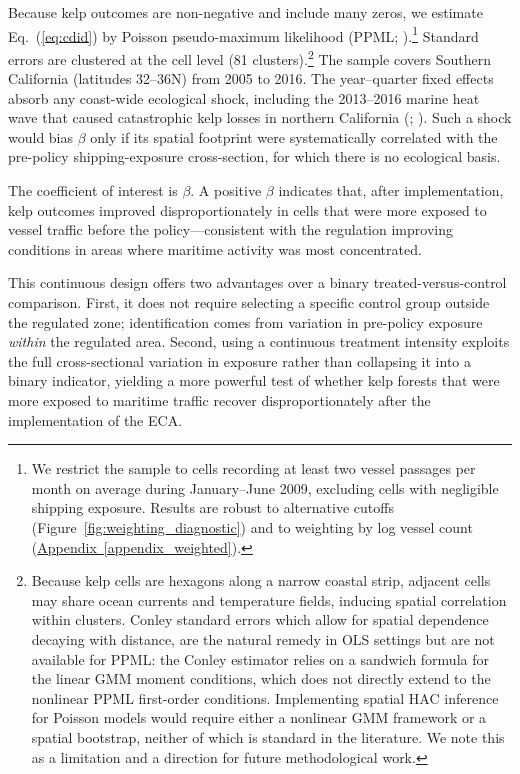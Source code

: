 \documentclass[12pt]{article}
\begin{document}
Because kelp outcomes are non-negative and include many zeros, we estimate Eq.~(\ref{eq:cdid}) by Poisson pseudo-maximum likelihood (PPML; \citealp{SantosSilva2006}).\footnote{We restrict the sample to cells recording at least two vessel passages per month on average during January--June 2009, excluding cells with negligible shipping exposure. Results are robust to alternative cutoffs (Figure~\ref{fig:weighting_diagnostic}) and to weighting by log vessel count (\hyperref[appendix_weighted]{Appendix~\ref*{appendix_weighted}}).} Standard errors are clustered at the cell level (81 clusters).\footnote{Because kelp cells are hexagons along a narrow coastal strip, adjacent cells may share ocean currents and temperature fields, inducing spatial correlation within clusters. Conley standard errors \citep{Conley1999} which allow for spatial dependence decaying with distance, are the natural remedy in OLS settings but are not available for PPML: the Conley estimator relies on a sandwich formula for the linear GMM moment conditions, which does not directly extend to the nonlinear PPML first-order conditions. Implementing spatial HAC inference for Poisson models would require either a nonlinear GMM framework or a spatial bootstrap, neither of which is standard in the literature. We note this as a limitation and a direction for future methodological work.} The sample covers Southern California (latitudes 32\textdegree--36\textdegree N) from 2005 to 2016. The year--quarter fixed effects absorb any coast-wide ecological shock, including the 2013--2016 marine heat wave that caused catastrophic kelp losses in northern California (\citealp{RogersBennett2019}; \citealp{McPherson2021}). Such a shock would bias $\beta$ only if its spatial footprint were systematically correlated with the pre-policy shipping-exposure cross-section, for which there is no ecological basis.

The coefficient of interest is $\beta$. A positive $\beta$ indicates that, after implementation, kelp outcomes improved disproportionately in cells that were more exposed to vessel traffic before the policy---consistent with the regulation improving conditions in areas where maritime activity was most concentrated.

This continuous design offers two advantages over a binary treated-versus-control comparison. First, it does not require selecting a specific control group outside the regulated zone; identification comes from variation in pre-policy exposure \emph{within} the regulated area. Second, using a continuous treatment intensity exploits the full cross-sectional variation in exposure rather than collapsing it into a binary indicator, yielding a more powerful test of whether kelp forests that were more exposed to maritime traffic recover disproportionately after the implementation of the ECA.
\end{document}
